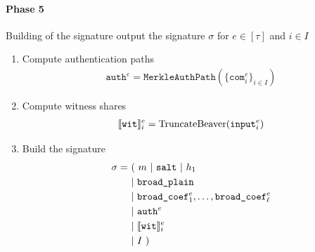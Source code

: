 \documentclass[11pt]{report}
\theoremstyle{definition}
\theoremstyle{plain}
\begin{document}
\begin{protocol}
  \paragraph{Phase 5} Building of the signature output the signature $\sigma$ for $e \in [\tau]$ and $i \in I$
  \begin{enumerate}[itemsep=0pt, topsep=0pt, parsep=0pt]
    \item Compute authentication paths
          \begin{align*}
            \texttt{auth}^e = \texttt{MerkleAuthPath}(\{\texttt{com}^e_i\}_{i \in I})
          \end{align*}
    \item Compute witness shares
          \begin{align*}
            \llbracket \texttt{wit} \rrbracket_i^e = \text{TruncateBeaver}(\texttt{input}^e_i)
          \end{align*}
    \item Build the signature
          \begin{align*}
            \sigma = & \ (\ m\ |\ \texttt{salt}\ |\ h_1                                  \\
                     & \ |\ \texttt{broad\_plain}                                        \\
                     & \ |\ \texttt{broad\_coef}^e_1, \dots, \texttt{broad\_coef}^e_\ell \\
                     & \ |\ \texttt{auth}^e                                              \\
                     & \ |\ \sh{\texttt{wit}}_i^e                                        \\
                     & \ |\ I\ )
          \end{align*}
  \end{enumerate}
\end{protocol}
\end{document}
